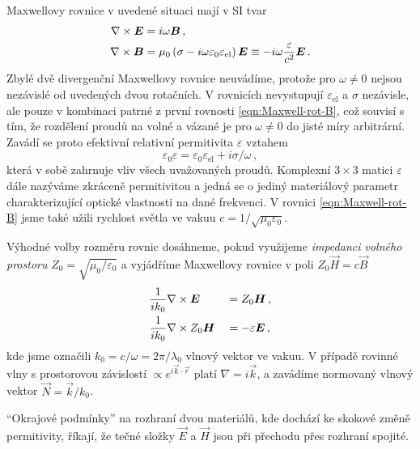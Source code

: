 Maxwellovy rovnice v uvedené situaci mají v SI tvar
\begin{align}
    \nabla\times \bm{E}&=i\omega\bm{B} \,, \label{eqn:Maxwell-rot-E} \\
    \nabla\times \bm{B}&=\mu_0 \left( \sigma - i\omega \varepsilon_0 \varepsilon_{\textrm{el}} \right) \bm{E} 
        \equiv -i\omega\frac{\varepsilon}{c^2} \bm{E} \,. \label{eqn:Maxwell-rot-B}
\end{align}
Zbylé dvě divergenční Maxwellovy rovnice neuvádíme, protože pro $\omega\neq 0$ nejsou nezávislé od uvedených dvou rotačních.
V rovnicích nevystupují $\varepsilon_{\textrm{el}}$ a $\sigma$ nezávisle, ale pouze v kombinaci patrné z první rovnosti \eqref{eqn:Maxwell-rot-B}, což souvisí s tím, že rozdělení proudů na volné a vázané je pro $\omega\neq 0$ do jisté míry arbitrární.
Zavádí se proto efektivní relativní permitivita $\varepsilon$ vztahem
\begin{equation}
    \varepsilon_0 \varepsilon=\varepsilon_0 \varepsilon_{\textrm{el}}+i\sigma/\omega \,,
\end{equation}
která v sobě zahrnuje vliv všech uvažovaných proudů.
Komplexní $3\times 3$ matici $\varepsilon$ dále nazýváme zkráceně permitivitou a jedná se o jediný materiálový parametr charakterizující optické vlastnosti na dané frekvenci.
V rovnici \eqref{eqn:Maxwell-rot-B} jsme také užili rychlost světla ve vakuu $c=1/\sqrt{\mu_0 \varepsilon_0}$.

Výhodné volby rozměru rovnic dosáhneme, pokud využijeme \emph{impedanci volného prostoru} $Z_0 = \sqrt{\mu_0/\varepsilon_0}$ a vyjádříme Maxwellovy rovnice v poli $Z_0 \vec{H}=c \vec{B}$
\begin{alignat}{2}
    & \frac{1}{ik_0} \nabla\times \bm{E} &&= Z_0 \bm{H} \,, \label{eqn:rot-E}\\
    & \frac{1}{ik_0}  \nabla\times Z_0 \bm{H} &&=-\varepsilon \bm{E} \,, \label{eqn:rot-ZH}
\end{alignat}
kde jsme označili $k_0 = c/\omega = 2\pi/\lambda_0$ vlnový vektor ve vakuu.
V případě rovinné vlny s prostorovou závislostí $\propto e^{i \vec{k}\cdot \vec{r}}$ platí $\nabla = i\vec{k}$, a zavádíme normovaný vlnový vektor $\vec{N}=\vec{k}/k_0$.

``Okrajové podmínky'' na rozhraní dvou materiálů, kde dochází ke skokové změně permitivity, říkají, že tečné složky $\vec{E}$ a $\vec{H}$ jsou při přechodu přes rozhraní spojité\cite{bornPrinciplesOpticsElectromagnetic1999}.
